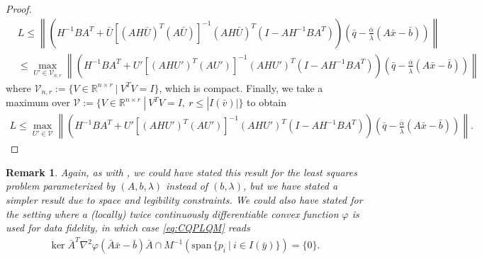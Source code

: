 \documentclass[reqno]{amsart}
\newtheorem{remark}[proposition]{Remark}
\numberwithin{equation}{section}
\newcommand{\R}{\mathbb{R}}
\newcommand{\x}{\bar{x}}
\newcommand{\lin}{\mathrm{span}\,}
\begin{document}
\begin{proof}
 {\small\begin{align*}
     &L \le \left\lVert (H^{-1}BA^T + \bar{U}[(AH \bar{U})^T (A \bar{U})]^{-1} (AH \bar{U})^{T} (I - AH^{-1}BA^T)) \left(\bar q - \frac{\bar \alpha}{\bar \lambda}(A \bar x - \bar b)\right) \right\rVert \\ & \le \max_{U' \in \mathcal{V}_{n,r}} 
    \left\lVert (H^{-1}BA^T + U'[(AH U')^T (AU')]^{-1} (AH U')^{T} (I - AH^{-1}BA^T)) \left(\bar q - \frac{\bar \alpha}{\bar \lambda}(A \bar x - \bar b)\right) \right\rVert
 \end{align*}}
 where $\mathcal{V}_{n,r} := \{V \in \R^{n \times r}\ | \ V^TV = I\}$, which is compact. Finally, we take a maximum over $\mathcal{V} := \{V \in \R^{n \times r} \ | \ V^TV = I, \ r \le |I(\bar v)|\}$ to obtain
 {\small
 \begin{align*}
  L \le
     \max_{U' \in \mathcal{V}} \left\lVert (H^{-1}BA^T + U'[(AH U')^T (AU')]^{-1} (AH U')^{T} (I - AH^{-1}BA^T)) \left(\bar q - \frac{\bar \alpha}{\bar \lambda}(A \bar x - \bar b)\right) \right\rVert.
 \end{align*}
}






\end{proof}

\begin{remark} Again, as with , we could have stated this result for the least squares problem parameterized by $(A, b, \lambda)$ instead of $(b, \lambda)$, but we have stated a simpler result due to space and legibility constraints. We could also have stated  for the setting where a (locally) twice continuously differentiable convex function $\varphi$ is used for data fidelity, in which case \eqref{eq:CQPLQM} reads
\begin{align*}
    \ker \bar{A}^T\nabla^2 \varphi(\bar{A} \x - \bar b)\bar{A} \cap M^{-1}(\lin \{p_i \ | \ i \in I(\bar y)\}) = \{0\}.
\end{align*}
\end{remark}
\end{document}
